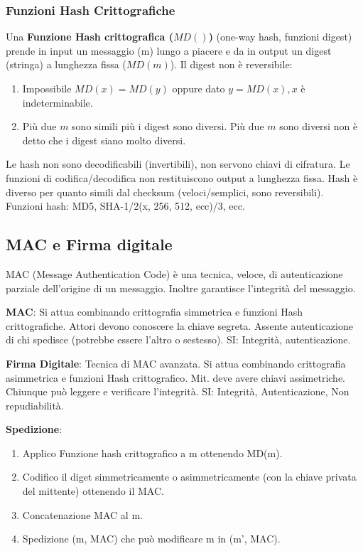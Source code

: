 \subsubsection{Funzioni Hash Crittografiche}
Una \textbf{Funzione Hash crittografica ($MD()$)} (one-way hash, funzioni digest) prende in input un messaggio (m) lungo a piacere e da in output un digest (stringa) a lunghezza fissa ($MD(m)$).
Il digest non è reversibile:
\begin{enumerate}
	\item Impossibile $MD(x)=MD(y)$ oppure dato $y=MD(x), x$ è indeterminabile.

	\item Più due $m$ sono simili più i digest sono diversi. Più due $m$ sono diversi non è detto che i digest siano molto diversi.
\end{enumerate}
Le hash non sono decodificabili (invertibili), non servono chiavi di cifratura. Le funzioni di codifica/decodifica non restituiscono output a lunghezza fissa.
Hash è diverso per quanto simili dal checksum (veloci/semplici, sono reversibili).
Funzioni hash: MD5, SHA-1/2(x, 256, 512, ecc)/3, ecc.

\subsection{MAC e Firma digitale}
MAC (Message Authentication Code) è una tecnica, veloce, di autenticazione parziale dell'origine di un messaggio. Inoltre garantisce l'integrità del messaggio.

\bigskip

\textbf{MAC}: Si attua combinando crittografia simmetrica e funzioni Hash crittografiche. Attori devono conoscere la chiave segreta. Assente autenticazione di chi spedisce (potrebbe essere l'altro o sestesso). SI: Integrità, autenticazione.

\textbf{Firma Digitale}: Tecnica di MAC avanzata. Si attua combinando crittografia asimmetrica e funzioni Hash crittografico. Mit. deve avere chiavi assimetriche. Chiunque può leggere e verificare l'integrità. SI: Integrità, Autenticazione, Non repudiabilità.

\bigskip

\textbf{Spedizione}:
\begin{enumerate}
	\item Applico Funzione hash crittografico a m ottenendo MD(m).
	\item Codifico il diget simmetricamente o asimmetricamente (con la chiave privata del mittente) ottenendo il MAC.
	\item Concatenazione MAC al m.
	\item Spedizione (m, MAC) che può modificare m in (m', MAC).
\end{enumerate}

